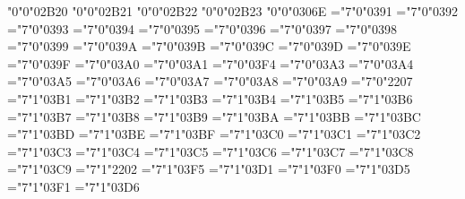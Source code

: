 \mchardef\pentagon"0"0"02B20
\mchardef\varhexagon"0"0"02B21
\mchardef\varhexagonblack"0"0"02B22
\mchardef\hexagonblack"0"0"02B23
\def\lbrbrak{\delim"4"0"03014 }
\def\rbrbrak{\delim"5"0"03015 }
\def\Lbrbrak{\delim"4"0"03018 }
\def\Rbrbrak{\delim"5"0"03019 }
\mchardef\hiraganano"0"0"0306E
\mchardef\Alpha="7"0"0391
\mchardef\Beta="7"0"0392
\mchardef\Gamma="7"0"0393
\mchardef\Delta="7"0"0394
\mchardef\Epsilon="7"0"0395
\mchardef\Zeta="7"0"0396
\mchardef\Eta="7"0"0397
\mchardef\varTheta="7"0"0398
\mchardef\Iota="7"0"0399
\mchardef\Kappa="7"0"039A
\mchardef\Lambda="7"0"039B
\mchardef\Mu="7"0"039C
\mchardef\Nu="7"0"039D
\mchardef\Xi="7"0"039E
\mchardef\Omicron="7"0"039F
\mchardef\Pi="7"0"03A0
\mchardef\Rho="7"0"03A1
\mchardef\Theta="7"0"03F4
\mchardef\Sigma="7"0"03A3
\mchardef\Tau="7"0"03A4
\mchardef\Upsilon="7"0"03A5
\mchardef\Phi="7"0"03A6
\mchardef\Chi="7"0"03A7
\mchardef\Psi="7"0"03A8
\mchardef\Omega="7"0"03A9
\mchardef\nabla="7"0"2207
\mchardef\alpha="7"1"03B1
\mchardef\beta="7"1"03B2
\mchardef\gamma="7"1"03B3
\mchardef\delta="7"1"03B4
\mchardef\epsilon="7"1"03B5
\mchardef\zeta="7"1"03B6
\mchardef\eta="7"1"03B7
\mchardef\theta="7"1"03B8
\mchardef\iota="7"1"03B9
\mchardef\kappa="7"1"03BA
\mchardef\lambda="7"1"03BB
\mchardef\mu="7"1"03BC
\mchardef\nu="7"1"03BD
\mchardef\xi="7"1"03BE
\mchardef\omicron="7"1"03BF
\mchardef\pi="7"1"03C0
\mchardef\rho="7"1"03C1
\mchardef\varsigma="7"1"03C2
\mchardef\sigma="7"1"03C3
\mchardef\tau="7"1"03C4
\mchardef\upsilon="7"1"03C5
\mchardef\varphi="7"1"03C6
\mchardef\chi="7"1"03C7
\mchardef\psi="7"1"03C8
\mchardef\omega="7"1"03C9
\mchardef\partial="7"1"2202
\mchardef\varepsilon="7"1"03F5
\mchardef\vartheta="7"1"03D1
\mchardef\varkappa="7"1"03F0
\mchardef\phi="7"1"03D5
\mchardef\varrho="7"1"03F1
\mchardef\varpi="7"1"03D6
